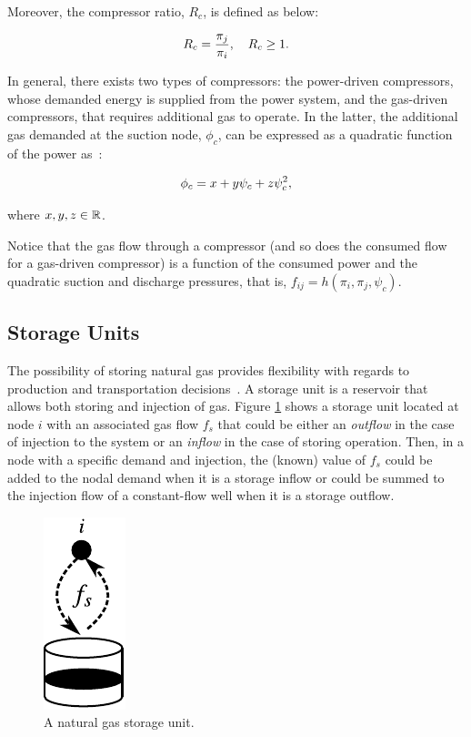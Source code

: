 Moreover, the compressor ratio, $R_c$, is defined as below:

\begin{equation}
	\label{eq:comp_ratio}
	R_c = \frac{\pi_j}{\pi_i}, \quad R_c\geq 1.
	\vspace{0.3cm}
\end{equation}

In general, there exists two types of compressors: the power-driven compressors, whose demanded energy is supplied from the power system, and the gas-driven compressors, that requires additional gas to operate. In the latter, the additional gas demanded at the suction node, $\phi_c$, can be expressed as a quadratic function of the power as~\cite{Chen2017}:

\begin{equation}
	\label{eq:f_cons_gas_comp}
	\phi_c = x+y\psi_c+z\psi_c^2, 
	\vspace{0.3cm}
\end{equation}

where $x,y,z \in \mathbb{R}$.

Notice that the gas flow through a compressor (and so does the consumed flow for a gas-driven compressor) is a function of the consumed power and the quadratic suction and discharge pressures, that is, $f_{ij}=h(\pi_i,\pi_j,\psi_c)$.  


\subsection{Storage Units}
\label{subsec:sto_units}

The possibility of storing natural gas provides flexibility with regards to production and transportation decisions~\cite{Midthun2007}. A storage unit is a reservoir that allows both storing and injection of gas. Figure \ref{fig:storage} shows a storage unit located at node $i$ with an associated gas flow $f_s$ that could be either an \textit{outflow} in the case of injection to the system or an \textit{inflow} in the case of storing operation. Then, in a node with a specific demand and injection, the (known) value of $f_s$ could be added to the nodal demand when it is a storage inflow or could be summed to the injection flow of a constant-flow well when it is a storage outflow.

\begin{figure}[!ht]
	\centering
	\includegraphics[scale=1]{Figures/Storage_unit}
	\caption{A natural gas storage unit.}	
	\label{fig:storage}
\end{figure}

